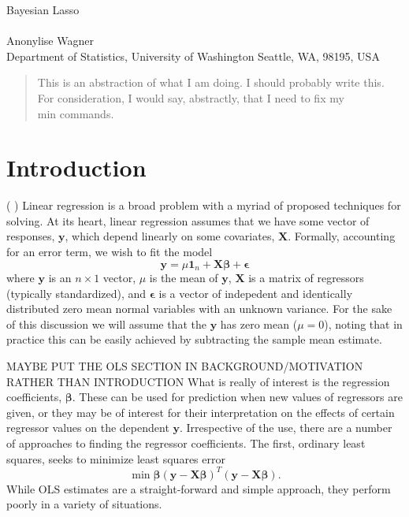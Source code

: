 \documentclass{uwstat572}
\newcommand{\vmcomment}[1]{({\color{blue}{VM's comment:}} \textbf{\color{blue}{#1}})}
\begin{document}

\begin{center}
  {\LARGE Bayesian Lasso}\\\ \\
  {Anonylise Wagner \\ 
    Department of Statistics, University of Washington Seattle, WA, 98195, USA
  }
\end{center}



\begin{abstract}
  This is an abstraction of what I am doing. I should probably write this. For consideration, I would say, abstractly, that I need to fix my \\min commands.
\end{abstract}

\section{Introduction}
\vmcomment{Your introduction looks more like beginning of the Methods section to me. Ideally, intro should introduce the problem without formulae. Need to motivate sparsity and give a literature review of sparse regression, explaining why it is useful and what people have done before Park and Casella paper.}
Linear regression is a broad problem with a myriad of proposed techniques for solving. At its heart, linear regression assumes that we have some vector of responses, $\boldsymbol{y}$, which depend linearly on some covariates, $\boldsymbol{X}$. Formally, accounting for an error term, we wish to fit the model \[
\boldsymbol{y} = \mu \boldsymbol{1}_n + \boldsymbol{X}\boldsymbol{\beta}+\boldsymbol{\epsilon}
\] where $\boldsymbol{y}$ is an $n \times 1$ vector, $\mu$ is the mean of $\boldsymbol{y}$, $\boldsymbol{X}$ is a matrix of regressors (typically standardized), and $\boldsymbol{\epsilon}$ is a vector of indepedent and identically distributed zero mean normal variables with an unknown variance. For the sake of this discussion we will assume that the $\boldsymbol{y}$ has zero mean ($\mu=0$), noting that in practice this can be easily achieved by subtracting the sample mean estimate.

MAYBE PUT THE OLS SECTION IN BACKGROUND/MOTIVATION RATHER THAN INTRODUCTION
What is really of interest is the regression coefficients, $\boldsymbol{\beta}$. These can be used for prediction when new values of regressors are given, or they may be of interest for their interpretation on the effects of certain regressor values on the dependent $\boldsymbol{y}$. Irrespective of the use, there are a number of approaches to finding the regressor coefficients. The first, ordinary least squares, seeks to minimize least squares error\[
\min{\boldsymbol{\beta}}(\boldsymbol{y}-\boldsymbol{X}\boldsymbol{\beta})^T(\boldsymbol{y}-\boldsymbol{X}\boldsymbol{\beta}).
\] While OLS estimates are a straight-forward and simple approach, they perform poorly in a variety of situations. 
\end{document}
